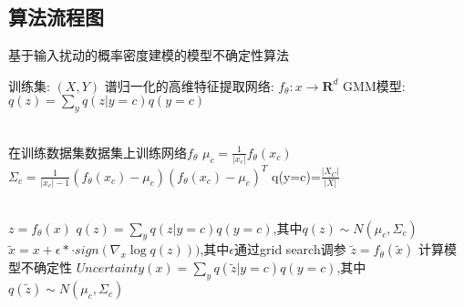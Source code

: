 \documentclass{article}
\begin{document}
\subsection{算法流程图}
\begin{algorithm}[h]
	\caption{基于输入扰动的概率密度建模的模型不确定性算法}
	\label{alg:1}
	
	\begin{algorithmic}[1]
		\Require 训练集: $(X,Y)$ 
		\Require 谱归一化的高维特征提取网络: $f_{\theta}:x \rightarrow \mathbf{R}^d $ 
		\Require GMM模型: $q(z) = \sum_{y}q(z|y=c)q(y=c)$
		
		\\
		\State 在训练数据集数据集上训练网络$f_{\theta}$
		\State $\mu_{c}=\frac{1}{|x_c|}f_{\theta}(x_c)$
		\State $\Sigma_c = \frac{1}{|x_c|-1}(f_{\theta}(x_c)-\mu_c)(f_{\theta}(x_c)-\mu_c)^T$
		\State q(y=c)=$\frac{|X_C|}{|X|}$
		\EndFor
		\EndProcedure

		
		\\
		\State $z=f_{\theta}(x)$
		\State  $q(z) = \sum_{y}q(z|y=c)q(y=c)$,其中$q(z)\sim N(\mu_c,\Sigma_c)$
		\State $\tilde{x}=x+\epsilon* \cdot sign(\nabla_x \log q(z)))$,其中$\epsilon$通过grid search调参
		\State $\tilde{z}=f_{\theta}(\tilde{x})$
		\State 计算模型不确定性 $Uncertainty(x) = \sum_{y}q(\tilde{z}|y=c)q(y=c)$,其中$q(\tilde{z})\sim N(\mu_c,\Sigma_c)$
		\EndProcedure
	\end{algorithmic}
\end{algorithm}
%
\end{document}
